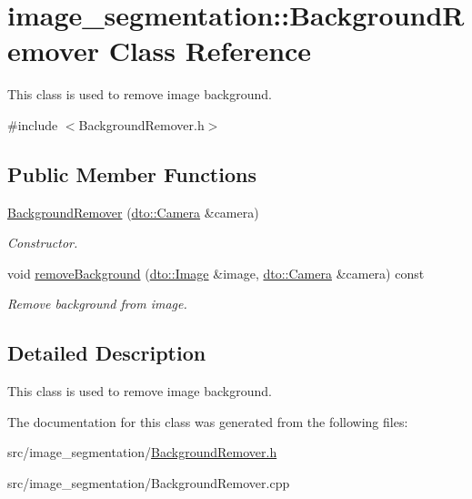 \hypertarget{classimage__segmentation_1_1_background_remover}{}\section{image\+\_\+segmentation\+:\+:Background\+Remover Class Reference}
\label{classimage__segmentation_1_1_background_remover}


This class is used to remove image background.  




{\ttfamily \#include $<$Background\+Remover.\+h$>$}

\subsection*{Public Member Functions}
\begin{DoxyCompactItemize}
\item 
\mbox{\label{classimage__segmentation_1_1_background_remover_a1f6dd43eef1ed7613d8c627549bb0679}} 
\mbox{\hyperlink{classimage__segmentation_1_1_background_remover_a1f6dd43eef1ed7613d8c627549bb0679}{Background\+Remover}} (\mbox{\hyperlink{structdto_1_1_camera}{dto\+::\+Camera}} \&camera)
\begin{DoxyCompactList}\small\item\em Constructor. \end{DoxyCompactList}\item 
\mbox{\label{classimage__segmentation_1_1_background_remover_acb301d4767ba3ff6ce68636fc1cf27c3}} 
void \mbox{\hyperlink{classimage__segmentation_1_1_background_remover_acb301d4767ba3ff6ce68636fc1cf27c3}{remove\+Background}} (\mbox{\hyperlink{structdto_1_1_image}{dto\+::\+Image}} \&image, \mbox{\hyperlink{structdto_1_1_camera}{dto\+::\+Camera}} \&camera) const
\begin{DoxyCompactList}\small\item\em Remove background from image. \end{DoxyCompactList}\end{DoxyCompactItemize}


\subsection{Detailed Description}
This class is used to remove image background. 

The documentation for this class was generated from the following files\+:\begin{DoxyCompactItemize}
\item 
src/image\+\_\+segmentation/\mbox{\hyperlink{_background_remover_8h}{Background\+Remover.\+h}}\item 
src/image\+\_\+segmentation/Background\+Remover.\+cpp\end{DoxyCompactItemize}
